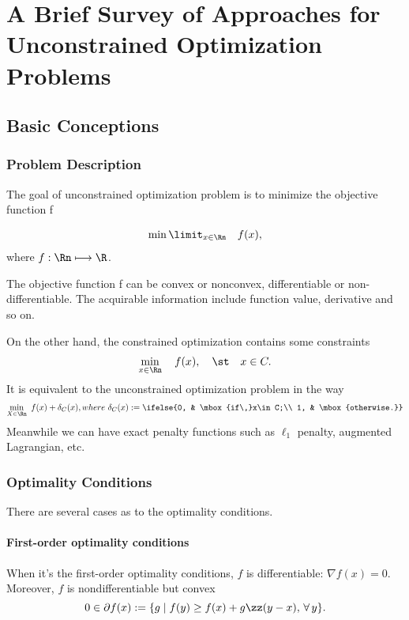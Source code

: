 \chapter{A Brief Survey of Approaches for Unconstrained Optimization Problems}

\section{Basic Conceptions}
\subsection{Problem Description}
The goal of unconstrained optimization problem is to minimize the objective function f
	
\begin{eqnarray*}
			\min\limit_{x\in\Rn} \quad f(x),
\end{eqnarray*}
where $f: \Rn \longmapsto \R$. 

The objective function f can be convex or nonconvex, differentiable or non-differentiable. The acquirable information include function value, derivative and so on.

On the other hand, the constrained optimization contains some constraints
\begin{eqnarray*}
	    	\min\limits_{x\in\Rn} \quad f(x), \quad \st \quad x\in C.
\end{eqnarray*}
It is equivalent to the unconstrained optimization problem in the way 
\begin{eqnarray*}
	    	\min\limits_{X\in\Rn} \,\, f(x) + \delta_C(x), where~  \delta_C(x):=\ifelse{0, & \mbox{if\,}x\in C;\\ 1, & \mbox{otherwise.}}
\end{eqnarray*}
Meanwhile we can have exact penalty functions such as $\ell_1$ penalty, augmented Lagrangian, etc.



\subsection{Optimality Conditions}
There are several cases as to the optimality conditions.

	\subsubsection{First-order optimality conditions}
When it's the first-order optimality conditions, $f$ is differentiable: $\nabla f(x)=0$. Moreover, $f$ is nondifferentiable but convex
		$$0\in \partial f(x):=\{g\mid f(y)\geq f(x)+ g\zz (y-x),\,\forall\, y \}.$$		
